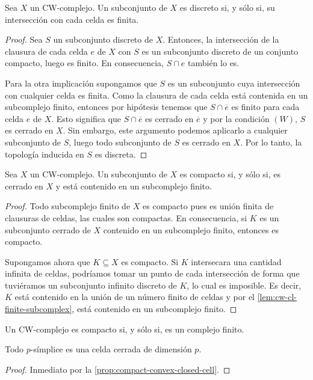 \begin{lema}
	Sea $X$ un CW-complejo. Un subconjunto de $X$ es discreto si, y sólo si, su
	intersección con cada celda es finita.
\end{lema}
\begin{proof}
	Sea $S$ un subconjunto discreto de $X$. Entonces, la intersección de la clausura
	de cada celda $e$ de $X$ con $S$ es un subconjunto discreto de un conjunto compacto,
	luego es finito. En consecuencia, $S \cap e$ también lo es.
	
	Para la otra implicación supongamos que $S$ es un subconjunto cuya
	intersección con cualquier celda es finita. Como la clausura de cada celda está
	contenida en un subcomplejo finito, entonces por hipótesis tenemos que
	$S \cap \overline{e}$ es finito para cada celda $e$ de $X$. Esto significa que
	$S \cap \overline{e}$ es cerrado en $\overline{e}$ y por la condición $(W)$,
	$S$ es cerrado en $X$. Sin embargo, este argumento podemos aplicarlo a
	cualquier subconjunto de $S$, luego todo subconjunto de $S$ es cerrado en $X$.
	Por lo tanto, la topología inducida en $S$ es discreta.
\end{proof}

\begin{teorema}
	Sea $X$ un CW-complejo. Un subconjunto de $X$ es compacto si, y sólo si, es
	cerrado en $X$ y está contenido en un subcomplejo finito.
\end{teorema}
\begin{proof}
	Todo subcomplejo finito de $X$ es compacto pues es unión finita de clausuras de
	celdas, las cuales son compactas. En consecuencia, si $K$ es un subconjunto
	cerrado de $X$ contenido en un subcomplejo finito, entonces es compacto.
	
	Supongamos ahora que $K \subseteq X$ es compacto. Si $K$ intersecara una
	cantidad infinita de celdas, podríamos tomar un punto de cada intersección de forma
	que tuviéramos un subconjunto infinito discreto de $K$, lo cual es imposible. Es
	decir, $K$ está contenido en la unión de un número finito de celdas y por el
	\autoref{lem:cw-cl-finite-subcomplex}, está contenido en un subcomplejo finito.
\end{proof}

\begin{corolario}
	Un CW-complejo es compacto si, y sólo si, es un complejo finito.
\end{corolario}

\begin{proposicion}
	Todo $p$-símplice es una celda cerrada de dimensión $p$.
\end{proposicion}
\begin{proof}
	Inmediato por la \autoref{prop:compact-convex-closed-cell}.
\end{proof}

